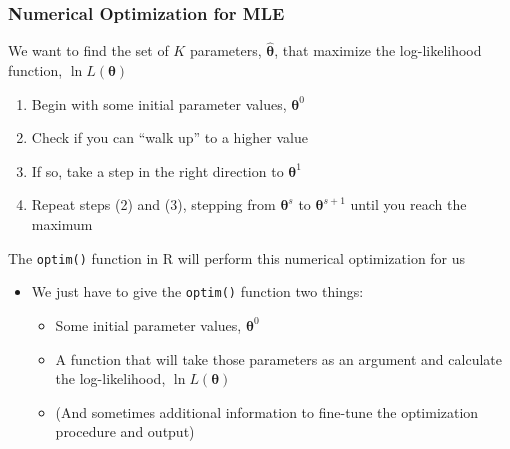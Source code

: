 \documentclass{beamer}
\begin{document}
\begin{frame}\frametitle{Numerical Optimization for MLE}
    We want to find the set of $K$ parameters, $\widehat{\bm{\theta}}$, that maximize the log-likelihood function, $\ln L(\bm{\theta})$
    \begin{enumerate}
        \item Begin with some initial parameter values, $\bm{\theta}^0$
        \item Check if you can ``walk up'' to a higher value
        \item If so, take a step in the right direction to $\bm{\theta}^1$
        \item Repeat steps (2) and (3), stepping from $\bm{\theta}^s$ to $\bm{\theta}^{s + 1}$ until you reach the maximum
    \end{enumerate}
    \vspace{3ex}
    The \texttt{optim()} function in R will perform this numerical optimization for us
    \begin{itemize}
        \item We just have to give the \texttt{optim()} function two things:
        \begin{itemize}
            \item Some initial parameter values, $\bm{\theta}^0$
            \item A function that will take those parameters as an argument and calculate the log-likelihood, $\ln L(\bm{\theta})$
            \item (And sometimes additional information to fine-tune the optimization procedure and output)
        \end{itemize}
    \end{itemize}
\end{frame}
\end{document}
